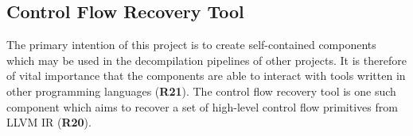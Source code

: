 
\subsection{Control Flow Recovery Tool}
\label{sec:req_control_flow_recovery_tool}

The primary intention of this project is to create self-contained components which may be used in the decompilation pipelines of other projects. It is therefore of vital importance that the components are able to interact with tools written in other programming languages (\textbf{R21}). The control flow recovery tool is one such component which aims to recover a set of high-level control flow primitives from LLVM IR (\textbf{R20}).

\begin{table}[htbp]
	\begin{center}
	\end{center}
	\caption{Requirements of the control flow recovery tool.}
\end{table}
